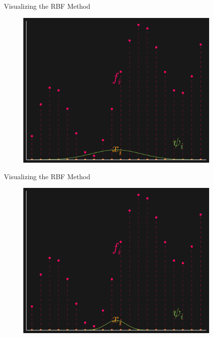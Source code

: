 \documentclass[12pt,t]{beamer}
\begin{document}
\begin{frame}{Visualizing the RBF Method}

\begin{figure}
\includegraphics[width=0.9\textwidth, keepaspectratio]{basisgaus1.png}
\end{figure}


\note{}
\end{frame}

\begin{frame}{Visualizing the RBF Method}

\begin{figure}
\includegraphics[width=0.9\textwidth, keepaspectratio]{basisgaus2.png}
\end{figure}


\note{}
\end{frame}
\end{document}

